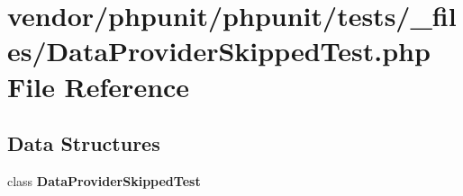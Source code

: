 \section{vendor/phpunit/phpunit/tests/\+\_\+files/\+Data\+Provider\+Skipped\+Test.php File Reference}
\label{_data_provider_skipped_test_8php}
\subsection*{Data Structures}
\begin{DoxyCompactItemize}
\item 
class {\bf Data\+Provider\+Skipped\+Test}
\end{DoxyCompactItemize}
